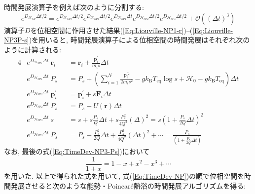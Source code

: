 時間発展演算子を例えば次のように分割する:
\begin{equation}
  e^{D_{\mathcal{H}_{\mathrm{NP}}}\Delta t/2}
  =
  e^{D_{\mathcal{H}_{\mathrm{NP3}}}\Delta t/2}
  e^{D_{\mathcal{H}_{\mathrm{NP2}}}\Delta t/2}
  e^{D_{\mathcal{H}_{\mathrm{NP1}}}\Delta t}
  e^{D_{\mathcal{H}_{\mathrm{NP2}}}\Delta t/2}
  e^{D_{\mathcal{H}_{\mathrm{NP3}}}\Delta t/2}
  +
  \mathcal{O}((\Delta t)^{3})
  \label{Eq:TimeDev-NP}
\end{equation}
演算子$D$を位相空間に作用させた結果(\ref{Eq:Liouville-NP1-r})--(\ref{Eq:Liouville-NP3P-s})を用いると, 時間発展演算子による位相空間の時間発展はそれぞれ次のように計算される:
\begin{alignat}{4}
  &e^{D_{\mathcal{H}_{\mathrm{NP1}}}\Delta t} ~ \bm{r}_{i}
  &&=
  \bm{r}_{i}
  +
  \frac{\bm{p}_{i}^{\prime}}{m_{i}s} \Delta t
  \label{Eq:TimeDev-NP1-r} \\
  &e^{D_{\mathcal{H}_{\mathrm{NP1}}}\Delta t} ~ P_{s}
  &&=
  P_{s}
  +
  \left(
    \sum_{i=1}^{N}
    \frac{\bm{p}_{i}^{\prime 2}}{2m_{i}s^{2}}
    -
    g k_{\mathrm{B}} T_{\mathrm{eq}} \log s
    +
    \mathcal{H}_{0}
    -
    g k_{\mathrm{B}} T_{\mathrm{eq}}
  \right)
  \Delta t
  \label{Eq:TimeDev-NP1-Ps} \\
  &e^{D_{\mathcal{H}_{\mathrm{NP2}}}\Delta t} ~ \bm{p}_{i}^{\prime}
  &&=
  \bm{p}_{i}^{\prime}
  +
  s \bm{F}_{i} \Delta t
  \label{Eq:TimeDev-NP2-p} \\
  &e^{D_{\mathcal{H}_{\mathrm{NP2}}}\Delta t} ~ P_{s}
  &&=
  P_{s} - U(\bm{r}) \Delta t
  \label{Eq:TimeDev-NP2-Ps} \\
  &e^{D_{\mathcal{H}_{\mathrm{NP3}}}\Delta t} ~ s
  &&=
  s + s \frac{P_{s}}{Q} \Delta t + s \frac{P_{s}^{2}}{4Q^2} (\Delta)^{2}
  =
  s \left(1 + \frac{P_{s}}{2Q} \Delta t \right)^{2}
  \label{Eq:TimeDev-NP3-s} \\
  &e^{D_{\mathcal{H}_{\mathrm{NP3}}}\Delta t} ~ P_{s}
  &&=
  P_{s} - \frac{P_{s}^{2}}{2Q} \Delta t + \frac{P_{s}^{3}}{4Q^{2}} (\Delta t)^{2}
  + \cdots
  =
  \frac{P_{s}}{(1 + \frac{P_{s}}{2Q}\Delta t)}
  \label{Eq:TimeDev-NP3-Ps}
\end{alignat}
なお, 最後の式(\ref{Eq:TimeDev-NP3-Ps})において
\begin{equation}
  \frac{1}{1+x} = 1 - x + x^2 - x^3 + \cdots
\end{equation}
を用いた. 以上で得られた式を用いて, 式(\ref{Eq:TimeDev-NP})の順で位相空間を時間発展させると次のような能勢・Poincar\'{e}熱浴の時間発展アルゴリズムを得る:

